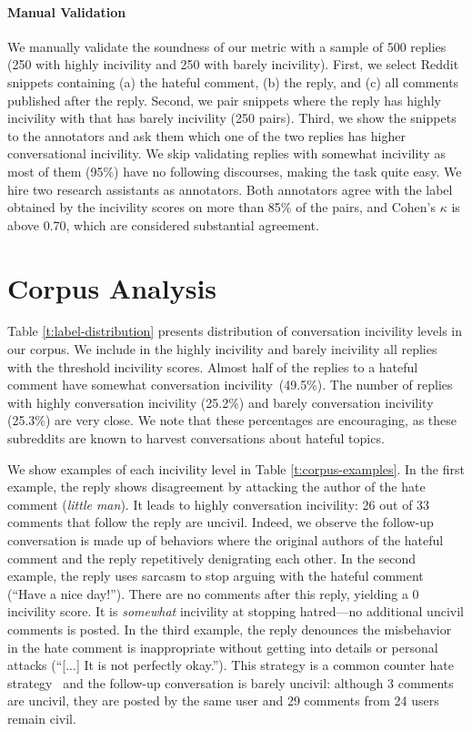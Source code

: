 \documentclass[11pt]{article}
\begin{document}
	
	
	\paragraph{Manual Validation}
	\label{ss:validation}
	We manually validate the soundness of our metric with a sample of 500 replies (250 with highly incivility and 250 with barely incivility).
	First, we select Reddit snippets containing 
	(a) the hateful comment,
	(b)	the reply,	and 
    (c) all comments published after the reply.
	Second, we pair snippets where the reply has highly incivility with that has barely incivility (250 pairs).
	Third, we show the snippets to the annotators
	and ask them which one of the two replies has higher conversational incivility.
	We skip validating replies with somewhat incivility as most of them (95\%) have no following discourses, making the task quite easy.
	We hire two research assistants as annotators.
	Both annotators agree with the label obtained by the incivility scores on more than 85\% of the pairs,
	and Cohen's $\kappa$ is above 0.70, which are considered substantial agreement.

	
	\section{Corpus Analysis} 
	\label{s:corpus_analysis}
	
	Table \ref{t:label-distribution} presents distribution of conversation incivility levels in our corpus.
	We include in the highly incivility and barely incivility all replies with the threshold incivility scores.
	Almost half of the replies to a hateful comment have somewhat conversation incivility~(49.5\%).
	The number of replies with highly conversation incivility (25.2\%) and barely conversation incivility (25.3\%) are very close.
	We note that these percentages are encouraging, as these subreddits are known to harvest conversations about hateful topics.
	
	We show examples of each incivility level in Table \ref{t:corpus-examples}. 
	In the first example,
	the reply shows disagreement by attacking the author of the hate comment (\emph{little man}).
	It leads to highly conversation incivility: 26 out of 33 comments that follow the reply are uncivil.
	Indeed, we observe the follow-up conversation is made up of behaviors where the original authors of the hateful comment and the reply  repetitively denigrating each other.
	In the second example, the reply uses sarcasm to stop arguing with the hateful comment  (``Have a nice day!'').
	There are no comments after this reply, yielding a 0 incivility score.
	It is \emph{somewhat} incivility at stopping hatred---no additional uncivil comments is posted.
	In the third example, the reply denounces the misbehavior in the hate comment is inappropriate without getting into details or personal attacks (``[...] It is not perfectly okay.'').
	This strategy is a common counter hate strategy~\cite{DBLP:conf/icwsm/MathewSTRSMG019} and the follow-up conversation is barely uncivil: although 3 comments are uncivil, they are posted by the same user and 29 comments from 24 users remain civil.
	
\end{document}
